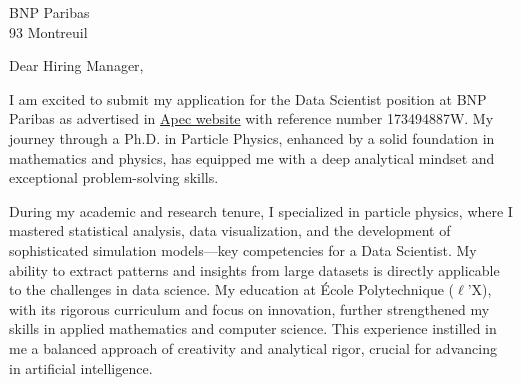 \documentclass[11pt,a4paper]{lettre}
\begin{document}
\begin{letter} 
{BNP Paribas  \\
93 
Montreuil }
\\
\address{Gaya \textsc{Benane}\\ 171 avenue de Luminy\\ 13~009~Marseille}  

\signature{Gaya \textsc{Benane}}
\nofax
\date{\today}

{}
\opening{\hspace{1em} Dear Hiring Manager,}
\hspace{1em}
I am excited to submit my application for the Data Scientist position at BNP Paribas as advertised in \href{https://www.apec.fr}{Apec website} with reference number 173494887W. My journey through a Ph.D. in Particle Physics, enhanced by a solid foundation in mathematics and physics, has equipped me with a deep analytical mindset and exceptional problem-solving skills.

\hspace{1em}
During my academic and research tenure, I specialized in particle physics, where I mastered statistical analysis, data visualization, and the development of sophisticated simulation models—key competencies for a Data Scientist. My ability to extract patterns and insights from large datasets is directly applicable to the challenges in data science.
My education at École Polytechnique ($\ell$’X), with its rigorous curriculum and focus on innovation, further strengthened my skills in applied mathematics and computer science. This experience instilled in me a balanced approach of creativity and analytical rigor, crucial for advancing in artificial intelligence.


\end{letter}
\end{document}
